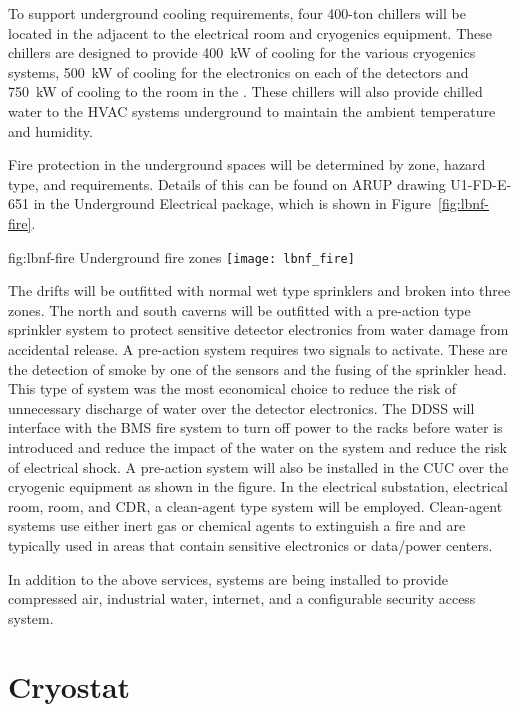 To support underground cooling requirements, four 400-ton chillers
will be located in the  adjacent to the electrical room and
cryogenics equipment.  These chillers are designed to provide
\SI{400}{\kilo\watt} of cooling for the various cryogenics systems,
\SI{500}{\kilo\watt} of cooling for the electronics on each of the
detectors and \SI{750}{\kilo\watt} of cooling to the  room
in the .  These chillers will also provide chilled water to
the HVAC systems underground to maintain the ambient temperature and
humidity.

Fire protection in the underground spaces will be determined by zone,
hazard type, and requirements.  Details of this can be found on ARUP
drawing U1-FD-E-651 in the Underground Electrical package, which is shown
in Figure~\ref{fig:lbnf-fire}.
\begin{dunefigure}{fig:lbnf-fire}
  {Underground fire zones}
 \texttt{[image: lbnf\_fire]}
\end{dunefigure}
The drifts will be outfitted with normal wet type sprinklers and
broken into three zones.  The north and south caverns will be outfitted
with a pre-action type sprinkler system to protect sensitive detector
electronics from water damage from accidental release.  A pre-action
system requires two signals to activate.  These are the detection of
smoke by one of the sensors and the fusing of the sprinkler
head.  This type of system was the most economical choice to reduce the
risk of unnecessary discharge of water over the detector electronics.
The DDSS will interface with the BMS fire system to turn off power
to the racks before water is introduced and reduce the impact of
the water on the system and reduce the risk of electrical shock.  A
pre-action system will also be installed in the CUC over the cryogenic
equipment as shown in the figure.  In the electrical substation,
electrical room,  room, and CDR, a clean-agent type system will be
employed.  Clean-agent systems use either inert gas or chemical agents
to extinguish a fire and are typically used in areas that contain
sensitive electronics or data/power centers.

In addition to the above services, systems are being installed to
provide compressed air, industrial water, internet, and a configurable
security access system.

\section{Cryostat}
\label{sec:fdsp-coord-cryostat}

